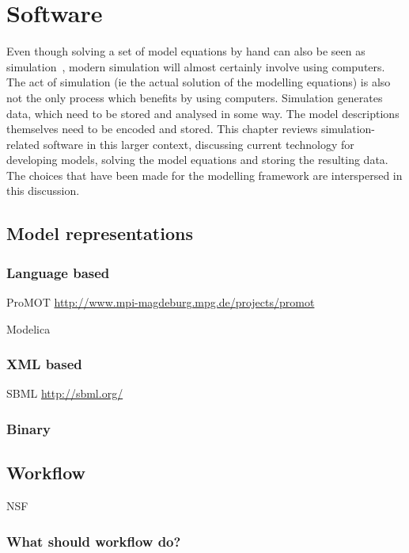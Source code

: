 \chapter{Software}
\label{chap:software}
\begin{overview}
  Even though solving a set of model equations by hand can also be
  seen as simulation~\citehere, modern simulation will almost certainly
  involve using computers.  The act of simulation (ie the actual
  solution of the modelling equations) is also not the only process
  which benefits by using computers.  Simulation generates data, which
  need to be stored and analysed in some way.  The model descriptions
  themselves need to be encoded and stored.  This chapter reviews
  simulation-related software in this larger context, discussing
  current technology for developing models, solving the model
  equations and storing the resulting data.  The choices that have
  been made for the modelling framework are interspersed in this
  discussion.
\end{overview}

\section{Model representations}

\subsection{Language based}

ProMOT \url{http://www.mpi-magdeburg.mpg.de/projects/promot}

Modelica

\subsection{XML based}

SBML \url{http://sbml.org/}


\subsection{Binary}


\section{Workflow}
NSF 

\subsection{What should workflow do?}

